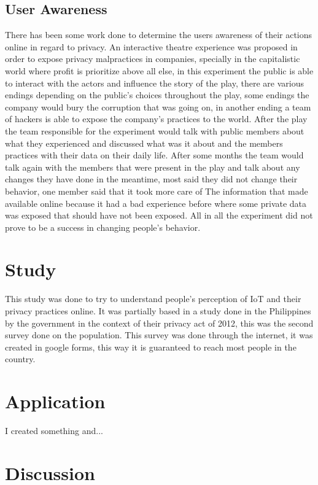 \documentclass[conference]{IEEEtran}
\begin{document}
\subsection{User Awareness}\label{AA}
There has been some work done to determine the users awareness of
their actions online in regard to privacy. An interactive theatre experience \cite{ColnagoInforming}
was proposed in order to expose privacy malpractices in companies,
specially in the capitalistic world where profit is prioritize
above all else, in this experiment the public is able to interact with
the actors and influence the story of the play, there are various endings depending
on the public's choices throughout the play, some endings the company would
bury the corruption that was going on, in another ending a team of hackers
is able to expose the company's practices to the world. After the play
the team responsible for the experiment would talk with public members about
what they experienced and discussed what was it about and the members
practices with their data on their daily life. After some months
the team would talk again with the members that were present in the play and
talk about any changes they have done in the meantime, most said they did
not change their behavior, one member said that it took more care of The
information that made available online because it had a bad experience before
where some private data was exposed that should have not been exposed. All in
all the experiment did not prove to be a success in changing people's behavior.

\section{Study}

This study was done to try to understand people's perception of IoT and their
privacy practices online. It was partially based in a study done in the Philippines by the
government in the context of their privacy act of 2012, this was the second survey done
on the population.
This survey was done through the internet, it was created in google forms, this way it
is guaranteed to reach most people in the country.

\section{Application}

I created something and...

\section{Discussion}
\end{document}
